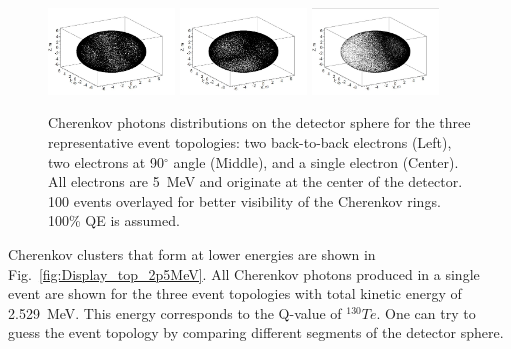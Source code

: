\documentclass[12pt,twoside,letterpaper]{article}
\newcommand{\Te}{^{130}Te}
\begin{document}
\begin{figure}[htb]
\centering
\includegraphics[angle=0,width=0.3\textwidth]{plots/hDisplay_topology180_5MeV.JPG}
\includegraphics[angle=0,width=0.3\textwidth]{plots/hDisplay_topology90_5MeV.JPG}
\includegraphics[angle=0,width=0.3\textwidth]{plots/hDisplay_1el_5MeV.JPG}
\caption{Cherenkov photons distributions on the detector sphere for the three representative event topologies: two back-to-back electrons (Left), two electrons at 90$^{\circ}$ angle (Middle), and a single electron (Center).  All electrons are 5~MeV and originate at the center of the detector. 100 events overlayed for better visibility of the Cherenkov rings. 100\% QE is assumed.}
\label{fig:Display_top_5MeV}
\end{figure}

Cherenkov clusters that form at lower energies are shown in Fig.~\ref{fig:Display_top_2p5MeV}. All Cherenkov photons produced in a single event are shown for the three event topologies with total kinetic energy of 2.529~MeV.  This energy corresponds to the Q-value of $\Te$. One can try to guess the event topology by comparing different segments of the detector sphere.
\end{document}
